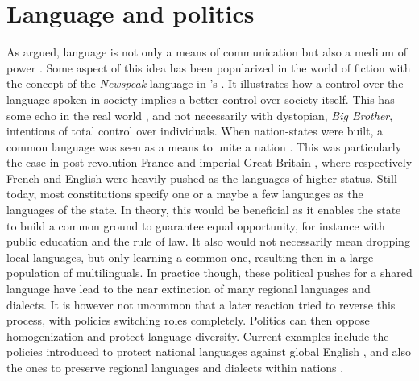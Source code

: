 \documentclass[../thesis.tex]{subfiles}
\begin{document}
\section{Language and politics}
As  argued, language is not only a
means of communication but also a medium of power \cite{BourdieuLanguageSymbolic2009}.
Some aspect of this idea has been popularized in the world of fiction with the concept
of the \emph{Newspeak} language in 's
 \cite{Orwell19841950}. It illustrates how a control over the
language spoken in society implies a better control over society itself. This has some
echo in the real world \cite{FowlerLanguageControl1979}, and not necessarily with
dystopian, \emph{Big Brother}, intentions of total control over individuals. When
nation-states were built, a common language was seen as a means to unite a nation
\cite{WrightCommunityCommunication2000}. This was particularly the case in
post-revolution France and imperial Great Britain
\cite{GrilloDominantLanguages1989,HigonnetPoliticsLinguistic1980}, where respectively
French and English were heavily pushed as the languages of higher status. Still today,
most constitutions specify one or a maybe a few languages as the languages of the state.
In theory, this would be beneficial as it enables the state to build a common ground to
guarantee equal opportunity, for instance with public education and the rule of law. It
also would not necessarily mean dropping local languages, but only learning a common
one, resulting then in a large population of multilinguals. In practice though, these
political pushes for a shared language have lead to the near extinction of many regional
languages and dialects. It is however not uncommon that a later reaction tried to
reverse this process, with policies switching roles completely. Politics can then
oppose homogenization and protect language diversity. Current examples include the
policies introduced to protect national languages against global English
\cite{SonntagLocalPolitics2003}, and also the ones to preserve regional languages and
dialects within nations \cite{KaplanLanguagePlanning1997}.


\end{document}
